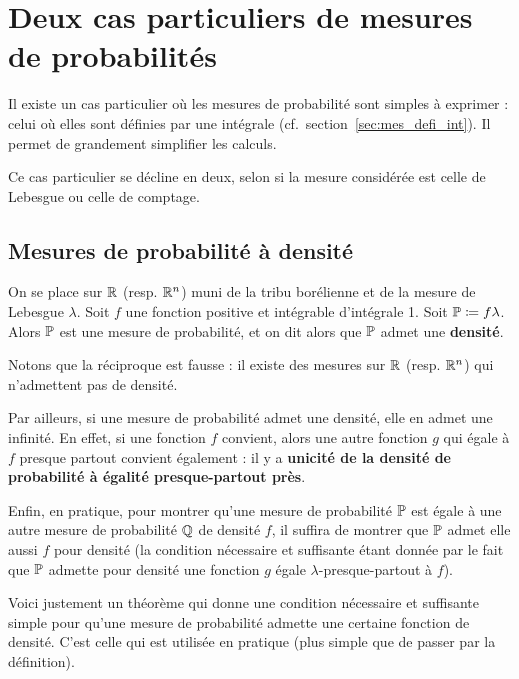 \documentclass[../integ-proba.tex]{subfiles}
\begin{document}
    \section{Deux cas particuliers de mesures de probabilités}
    \label{sec:probas_mes_particulieres}

    Il existe un cas particulier où les mesures de probabilité sont simples à exprimer : celui où elles sont définies par une intégrale (cf.\ section~\ref{sec:mes_defi_int}).
    Il permet de grandement simplifier les calculs.

    Ce cas particulier se décline en deux, selon si la mesure considérée est celle de Lebesgue ou celle de comptage.

    \subsection{Mesures de probabilité à densité}
    \begin{defi}
        On se place sur $\mathbb{R}$ (resp. $\mathbb{R}^n$) muni de la tribu borélienne et de la mesure de Lebesgue $\lambda$.
        Soit $f$ une fonction positive et intégrable d'intégrale 1.
        Soit $\mathbb{P}\coloneqq f \lambda$.
        Alors $\mathbb{P}$ est une mesure de probabilité, et on dit alors que $\mathbb{P}$ admet une \textbf{densité}.
    \end{defi}

    \begin{rem}
        \label{rem:densite}
        Notons que la réciproque est fausse : il existe des mesures sur $\mathbb{R}$ (resp. $\mathbb{R}^n$) qui n'admettent pas de densité.

        Par ailleurs, si une mesure de probabilité admet une densité, elle en admet une infinité.
        En effet, si une fonction $f$ convient, alors une autre fonction $g$ qui égale à $f$ presque partout convient également : il y a \textbf{unicité de la densité de probabilité à égalité presque-partout près}. %

        Enfin, en pratique, pour montrer qu'une mesure de probabilité $\mathbb{P}$ est égale à une autre mesure de probabilité $\mathbb{Q}$ de densité $f$, il suffira de montrer que $\mathbb{P}$ admet elle aussi $f$ pour densité (la condition nécessaire et suffisante étant donnée par le fait que $\mathbb{P}$ admette pour densité une fonction $g$ égale $\lambda$-presque-partout à $f$).
    \end{rem}

    Voici justement un théorème qui donne une condition nécessaire et suffisante simple pour qu'une mesure de probabilité admette une certaine fonction de densité.
    C'est celle qui est utilisée en pratique (plus simple que de passer par la définition).
\end{document}
